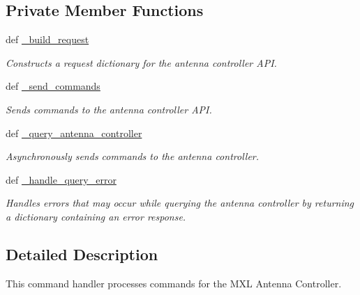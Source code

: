 \subsection*{Private Member Functions}
\begin{DoxyCompactItemize}
\item 
def \hyperlink{classhwm_1_1hardware_1_1devices_1_1drivers_1_1mxl__antenna__controller_1_1mxl__antenna__controll042461b90848f732dc4817f26065c532_a469a461bd0d476dc3c691fe7b70c5b13}{\-\_\-build\-\_\-request}
\begin{DoxyCompactList}\small\item\em Constructs a request dictionary for the antenna controller A\-P\-I. \end{DoxyCompactList}\item 
def \hyperlink{classhwm_1_1hardware_1_1devices_1_1drivers_1_1mxl__antenna__controller_1_1mxl__antenna__controll042461b90848f732dc4817f26065c532_afcd4180efc7324895c1c5792d0091b57}{\-\_\-send\-\_\-commands}
\begin{DoxyCompactList}\small\item\em Sends commands to the antenna controller A\-P\-I. \end{DoxyCompactList}\item 
def \hyperlink{classhwm_1_1hardware_1_1devices_1_1drivers_1_1mxl__antenna__controller_1_1mxl__antenna__controll042461b90848f732dc4817f26065c532_a38c7cbabc15d605ebcab02d83a532627}{\-\_\-query\-\_\-antenna\-\_\-controller}
\begin{DoxyCompactList}\small\item\em Asynchronously sends commands to the antenna controller. \end{DoxyCompactList}\item 
def \hyperlink{classhwm_1_1hardware_1_1devices_1_1drivers_1_1mxl__antenna__controller_1_1mxl__antenna__controll042461b90848f732dc4817f26065c532_a24b4bb0af920ed0525f910f09eff6803}{\-\_\-handle\-\_\-query\-\_\-error}
\begin{DoxyCompactList}\small\item\em Handles errors that may occur while querying the antenna controller by returning a dictionary containing an error response. \end{DoxyCompactList}\end{DoxyCompactItemize}


\subsection{Detailed Description}
This command handler processes commands for the M\-X\-L Antenna Controller. 


